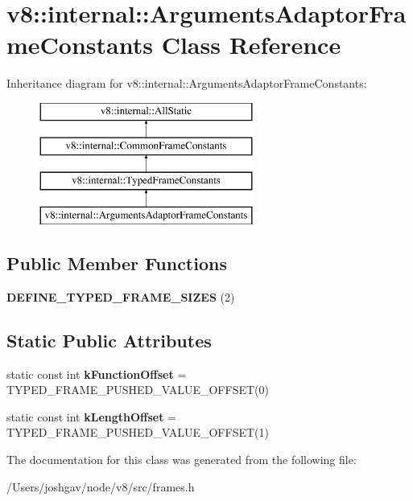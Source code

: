 \hypertarget{classv8_1_1internal_1_1_arguments_adaptor_frame_constants}{}\section{v8\+:\+:internal\+:\+:Arguments\+Adaptor\+Frame\+Constants Class Reference}
\label{classv8_1_1internal_1_1_arguments_adaptor_frame_constants}
Inheritance diagram for v8\+:\+:internal\+:\+:Arguments\+Adaptor\+Frame\+Constants\+:\begin{figure}[H]
\begin{center}
\leavevmode
\includegraphics[height=4.000000cm]{classv8_1_1internal_1_1_arguments_adaptor_frame_constants}
\end{center}
\end{figure}
\subsection*{Public Member Functions}
\begin{DoxyCompactItemize}
\item 
{\bfseries D\+E\+F\+I\+N\+E\+\_\+\+T\+Y\+P\+E\+D\+\_\+\+F\+R\+A\+M\+E\+\_\+\+S\+I\+Z\+ES} (2)\hypertarget{classv8_1_1internal_1_1_arguments_adaptor_frame_constants_a08da9edaeee92cad0267ac27b06e4f2a}{}\label{classv8_1_1internal_1_1_arguments_adaptor_frame_constants_a08da9edaeee92cad0267ac27b06e4f2a}

\end{DoxyCompactItemize}
\subsection*{Static Public Attributes}
\begin{DoxyCompactItemize}
\item 
static const int {\bfseries k\+Function\+Offset} = T\+Y\+P\+E\+D\+\_\+\+F\+R\+A\+M\+E\+\_\+\+P\+U\+S\+H\+E\+D\+\_\+\+V\+A\+L\+U\+E\+\_\+\+O\+F\+F\+S\+ET(0)\hypertarget{classv8_1_1internal_1_1_arguments_adaptor_frame_constants_a41bc6e56669b492c733f8530ebebd272}{}\label{classv8_1_1internal_1_1_arguments_adaptor_frame_constants_a41bc6e56669b492c733f8530ebebd272}

\item 
static const int {\bfseries k\+Length\+Offset} = T\+Y\+P\+E\+D\+\_\+\+F\+R\+A\+M\+E\+\_\+\+P\+U\+S\+H\+E\+D\+\_\+\+V\+A\+L\+U\+E\+\_\+\+O\+F\+F\+S\+ET(1)\hypertarget{classv8_1_1internal_1_1_arguments_adaptor_frame_constants_a272f31e6f70a111d5038a23890c9dfe6}{}\label{classv8_1_1internal_1_1_arguments_adaptor_frame_constants_a272f31e6f70a111d5038a23890c9dfe6}

\end{DoxyCompactItemize}


The documentation for this class was generated from the following file\+:\begin{DoxyCompactItemize}
\item 
/\+Users/joshgav/node/v8/src/frames.\+h\end{DoxyCompactItemize}
